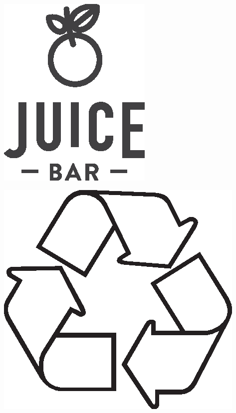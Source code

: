 \documentclass[12pt]{article}%
\begin{document}
\thispagestyle{empty}
\noindent\begin{minipage}{0.1\textwidth}%
\includegraphics[width=\linewidth]{logo.eps}\par
    \begin{center}
% 
\includegraphics[width=0.2\linewidth]{recycling.eps}\par

    \end{center}

\end{minipage} \hfill 
\end{document}
